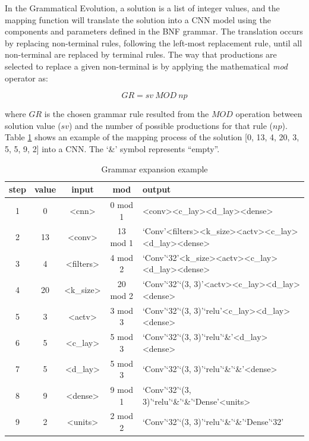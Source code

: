 \documentclass[12pt]{article}
\begin{document}
In the Grammatical Evolution, a solution is a list of integer values, and the mapping function will translate the solution into a CNN model using the components and parameters defined in the BNF grammar. The translation occurs by replacing non-terminal rules, following the left-most replacement rule, until all non-terminal are replaced by terminal rules. The way that productions are selected to replace a given non-terminal is by applying the mathematical \textit{mod} operator as:

\begin{equation}\label{eq:replace-eq}
	GR = sv~MOD~np
\end{equation}


where $GR$ is the chosen grammar rule resulted from the $MOD$ operation between solution value ($sv$) and the number of possible productions for that rule ($np$). Table \ref{tab:exp-example} shows an example of the mapping process of the solution [0, 13, 4, 20, 3, 5, 5, 9, 2] into a CNN. The `\&' symbol represents ``empty''.


\begin{table}[!htb]
	\small
	\caption{Grammar expansion example}
	\begin{tabular}{c|c|c|c|l}
		\hline
		step & value &   input   &   mod    & output                                                \\ \hline
		 1   &   0   &   <cnn>   & 0 mod 1  & <conv><c\_lay><d\_lay><dense>                         \\
		 2   &  13   &  <conv>   & 13 mod 1 & `Conv'<filters><k\_size><actv><c\_lay><d\_lay><dense> \\
		 3   &   4   & <filters> & 4 mod 2  & `Conv'`32'<k\_size><actv><c\_lay><d\_lay><dense>      \\
		 4   &  20   & <k\_size> & 20 mod 2 & `Conv'`32'`(3, 3)'<actv><c\_lay><d\_lay><dense>       \\
		 5   &   3   &  <actv>   & 3 mod 3  & `Conv'`32'`(3, 3)'`relu'<c\_lay><d\_lay><dense>       \\
		 6   &   5   & <c\_lay>  & 5 mod 3  & `Conv'`32'`(3, 3)'`relu'`\&'<d\_lay><dense>           \\
		 7   &   5   & <d\_lay>  & 5 mod 3  & `Conv'`32'`(3, 3)'`relu'`\&'`\&'<dense>               \\
		 8   &   9   &  <dense>  & 9 mod 1  & `Conv'`32'`(3, 3)'`relu'`\&'`\&'`Dense'<units>        \\
		 9   &   2   &  <units>  & 2 mod 2  & `Conv'`32'`(3, 3)'`relu'`\&'`\&'`Dense'`32'           \\ \hline
	\end{tabular}
	\label{tab:exp-example}
\end{table}
\end{document}
